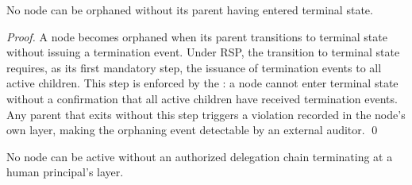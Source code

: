 \begin{lemm}
\label{lemm:orphan-safety}
No node can be orphaned without its parent having entered terminal state.
\end{lemm}

\begin{proof}
A node becomes orphaned when its parent transitions to terminal state without issuing a termination event. Under RSP, the transition to terminal state requires, as its first mandatory step, the issuance of termination events to all active children. This step is enforced by the \bounds: a node cannot enter terminal state without a \bounds confirmation that all active children have received termination events. Any parent that exits without this step triggers a \bounds violation recorded in the node's own \fact layer, making the orphaning event detectable by an external auditor. \qed
\end{proof}

\begin{cor}
\label{cor:ghost-authority}
No node can be active without an authorized delegation chain terminating at a human principal's \purpose layer.
\end{cor}

